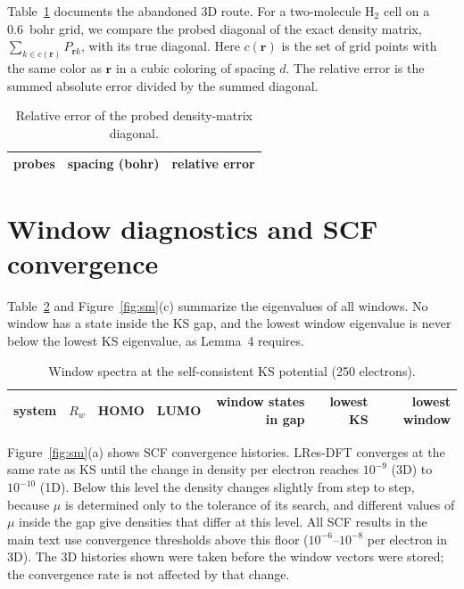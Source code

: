 \documentclass[aps,prb,onecolumn,superscriptaddress,floatfix]{revtex4-2}
\begin{document}
Table~\ref{tab:probing} documents the abandoned 3D route. For a two-molecule H$_2$ cell on a 0.6~bohr grid, we compare the
probed diagonal of the exact density matrix, $\sum_{k\in c(\bm r)}P_{\bm rk}$, with its true diagonal. Here $c(\bm r)$ is the
set of grid points with the same color as $\bm r$ in a cubic coloring of spacing $d$. The relative error is the summed
absolute error divided by the summed diagonal.

\begin{table}[h]
\caption{\label{tab:probing}Relative error of the probed density-matrix diagonal.}
\begin{ruledtabular}
\begin{tabular}{rrr}
probes & spacing (bohr) & relative error \\
\hline

\end{tabular}
\end{ruledtabular}
\end{table}

\section{Window diagnostics and SCF convergence}

Table~\ref{tab:windows} and Figure~\ref{fig:sm}(c) summarize the eigenvalues of all windows. No window has a state inside the
KS gap, and the lowest window eigenvalue is never below the lowest KS eigenvalue, as Lemma~4 requires.

\begin{table}[h]
\caption{\label{tab:windows}Window spectra at the self-consistent KS potential (250 electrons).}
\begin{ruledtabular}
\begin{tabular}{lrrrrrr}
system & $R_w$ & HOMO & LUMO & window states in gap & lowest KS & lowest window \\
\hline

\end{tabular}
\end{ruledtabular}
\end{table}

Figure~\ref{fig:sm}(a) shows SCF convergence histories. LRes-DFT converges at the same rate as KS until the change in density
per electron reaches $10^{-9}$ (3D) to $10^{-10}$ (1D). Below this level the density changes slightly from step to step,
because $\mu$ is determined only to the tolerance of its search, and different values of $\mu$ inside the gap give densities
that differ at this level. All SCF results in the main text use convergence thresholds above this floor ($10^{-6}$--$10^{-8}$
per electron in 3D). The 3D histories shown were taken before the window vectors were stored; the convergence rate is not
affected by that change.
\end{document}
